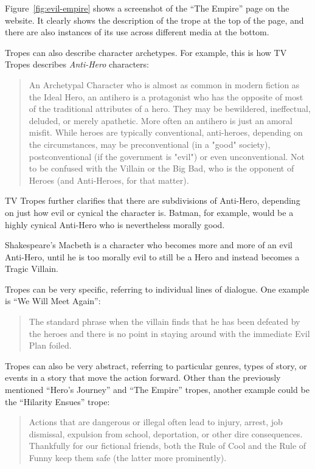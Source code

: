 \documentclass[11pt]{report}
\begin{document}
Figure~\ref{fig:evil-empire} shows a screenshot of the ``The Empire'' page on the
website. It clearly shows the description of the trope at the top of the page,
and there are also instances of its use across different media at the bottom.

Tropes can also describe character archetypes. For example, this is how TV
Tropes describes \emph{Anti-Hero} characters:

\begin{quote}
An Archetypal Character who is almost as common in modern fiction as the Ideal Hero, an antihero is a protagonist who has the opposite of most of the traditional attributes of a hero. They may be bewildered, ineffectual, deluded, or merely apathetic. More often an antihero is just an amoral misfit. While heroes are typically conventional, anti-heroes, depending on the circumstances, may be preconventional (in a "good" society), postconventional (if the government is "evil") or even unconventional. Not to be confused with the Villain or the Big Bad, who is the opponent of Heroes (and Anti-Heroes, for that matter).
  \end{quote}

TV Tropes further clarifies that there are subdivisions of
Anti-Hero, depending on just how evil or cynical the character is. Batman, for
example, would be a highly cynical Anti-Hero who is nevertheless morally good.

Shakespeare's Macbeth is a character who becomes more and more of an evil Anti-Hero, until he is too morally evil
to still be a Hero and instead becomes a Tragic Villain.

Tropes can be very specific, referring to individual lines of dialogue.
One example is ``We Will Meet Again'':

\begin{quote}
The standard phrase when the villain finds that he has been defeated by the heroes and there is no point in staying around with the immediate Evil Plan foiled.
\end{quote}

Tropes can also be very abstract, referring to particular genres, types of
story, or events in a story that move the action forward. Other than the
previously mentioned ``Hero's Journey'' and ``The Empire'' tropes, another
example could be the ``Hilarity Ensues'' trope:

\begin{quote}
Actions that are dangerous or illegal often lead to injury, arrest, job dismissal, expulsion from school, deportation, or other dire consequences. Thankfully for our fictional friends, both the Rule of Cool and the Rule of Funny keep them safe (the latter more prominently).
\end{quote}
\end{document}
